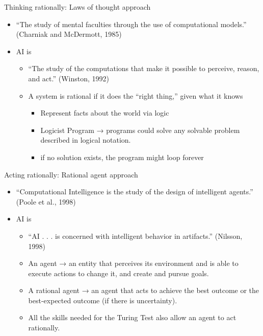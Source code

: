 \documentclass{beamer}
\begin{document}
\begin{frame}{Thinking rationally: Laws of thought approach}
\begin{itemize}
\item “The study of mental faculties through the use of computational models.”
(Charniak and McDermott, 1985)
\item AI is
\begin{itemize}
\item “The study of the computations that make it possible to perceive, reason, and act.”
(Winston, 1992)
\item A system is rational if it does the “right thing,” given what it knows
\begin{itemize}
\item Represent facts about the world via logic
\item Logicist Program → programs could solve any solvable problem described in logical notation.
\item if no solution exists, the program might loop forever
\end{itemize}
\end{itemize}
\end{itemize}
\end{frame}

\begin{frame}{Acting rationally: Rational agent approach}
\begin{itemize}
\item “Computational Intelligence is the study of the design of intelligent agents.”
(Poole et al., 1998)
\item AI is
\begin{itemize}
\item “AI . . . is concerned with intelligent behavior in artifacts.”
(Nilsson, 1998)
\item An agent → an entity that perceives its environment and is able to execute actions to change it, and create and pursue goals.
\item A rational agent → an agent that acts to achieve the best outcome or the best-expected outcome (if there is uncertainty).
\item All the skills needed for the Turing Test also allow an agent to act rationally.
\end{itemize}
\end{itemize}
\end{frame}
\end{document}
